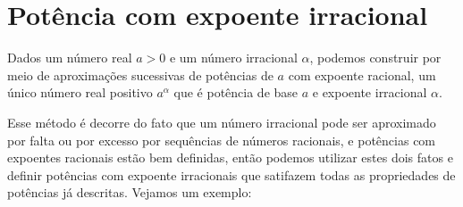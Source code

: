  \section{Potência com expoente irracional}

 Dados um número real $a > 0$ e um número irracional $\alpha$, podemos construir por meio de aproximações sucessivas de potências de $a$ com expoente racional, um único número real positivo $a^{\alpha}$ que é potência de base $a$ e expoente irracional $\alpha$.

 Esse método é decorre do fato que um número irracional pode ser aproximado por falta ou por excesso por sequências de números racionais, e potências com expoentes racionais estão bem definidas, então podemos utilizar estes dois fatos e definir potências com expoente irracionais que satifazem todas as propriedades de potências já descritas. Vejamos um exemplo:

